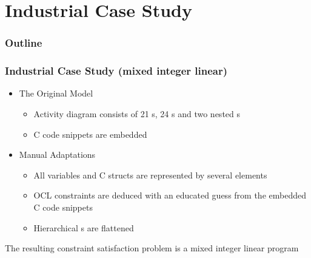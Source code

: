 \documentclass{beamer}
\begin{document}
\section{Industrial Case Study}
\begin{frame}
\frametitle{Outline} \tableofcontents[currentsection]
\end{frame}

\begin{frame}
\frametitle{Industrial Case Study (mixed integer linear)}
\begin{itemize}
  \item The Original Model
\begin{itemize}
  \item Activity diagram consists of 21 s, 24
  s and two nested s 
  \item C code snippets are embedded
\end{itemize}
\item Manual Adaptations
  \begin{itemize}
  \item All variables and C structs are represented by several  elements
  \item OCL constraints are deduced with an educated guess from the embedded C code snippets
  \item Hierarchical s are flattened
\end{itemize}
\end{itemize}
\begin{block}{}
The resulting constraint satisfaction problem is a mixed integer linear program
\end{block}
\end{frame}
\end{document}
